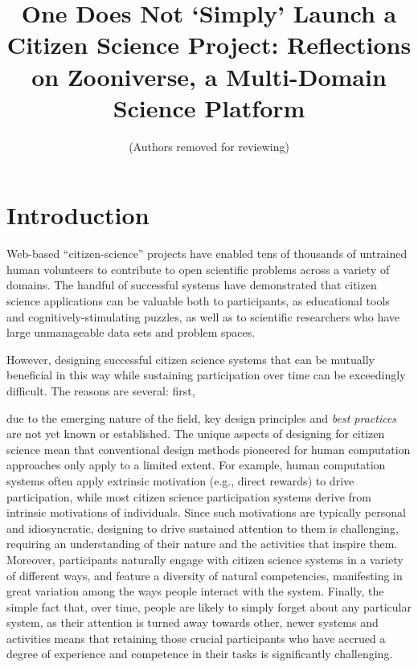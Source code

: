 \documentclass{sigchi}
\begin{document}
\title{One Does Not `Simply' Launch a Citizen Science Project: Reflections on Zooniverse, a Multi-Domain Science Platform}

 \author{ (Authors removed for reviewing) }
\maketitle

\begin{abstract}

\end{abstract}




\section{Introduction}

Web-based ``citizen-science'' projects have enabled tens of thousands
of untrained human volunteers to contribute to open scientific
problems across a variety of domains.  The handful of successful
systems have demonstrated that citizen science applications can be
valuable both to participants, as educational tools and
cognitively-stimulating puzzles, as well as to scientific researchers
who have large unmanageable data sets and problem spaces.

However, designing successful citizen science systems that can be
mutually beneficial in this way while sustaining participation over
time can be exceedingly difficult.  The reasons are several: first,

due to the emerging nature of the field, key design principles and
\emph{best practices} are not yet known or established.  The unique
aspects of designing for citizen science mean that conventional design
methods pioneered for human computation approaches only apply to a
limited extent.  For example, human computation systems often apply
extrinsic motivation (e.g., direct rewards) to drive participation,
while most citizen science participation systems derive from intrinsic
motivations of individuals.  Since such motivations are typically
personal and idiosyncratic, designing to drive sustained attention to
them is challenging, requiring an understanding of their nature and
the activities that inspire them.  Moreover, participants naturally
engage with citizen science systems in a variety of different ways,
and feature a diversity of natural competencies, manifesting in great
variation among the ways people interact with the system. Finally, the
simple fact that, over time, people are likely to simply forget about
any particular system, as their attention is turned away towards
other, newer systems and activities means that retaining those crucial
participants who have accrued a degree of experience and competence in
their tasks is significantly challenging.
\end{document}
